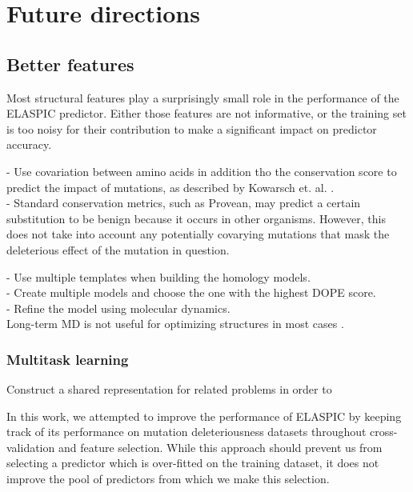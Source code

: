 
\chapter{Future directions} \label{chap:future_directions}

\section{Better features}

Most structural features play a surprisingly small role in the performance of the ELASPIC predictor. Either those features are not informative, or the training set is too noisy for their contribution to make a significant impact on predictor accuracy.



- Use covariation between amino acids in addition tho the conservation score to predict the impact of mutations, as described by Kowarsch et. al. \cite{kowarsch_correlated_2010}. \\
- Standard conservation metrics, such as Provean, may predict a certain substitution to be benign because it occurs in other organisms. However, this does not take into account any potentially covarying mutations that mask the deleterious effect of the mutation in question.



- Use multiple templates when building the homology models. \\
- Create multiple models and choose the one with the highest DOPE score. \\
- Refine the model using molecular dynamics. \\

Long-term MD is not useful for optimizing structures in most cases \cite{raval_refinement_2012}.


\subsection{Multitask learning}

Construct a shared representation for related problems in order to

In this work, we attempted to improve the performance of ELASPIC by keeping track of its performance on mutation deleteriousness datasets throughout cross-validation and feature selection. While this approach should prevent us from selecting a predictor which is over-fitted on the training dataset, it does not improve the pool of predictors from which we make this selection.

